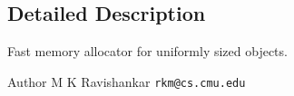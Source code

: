 \subsection{Detailed Description}
Fast memory allocator for uniformly sized objects. 

\begin{DoxyAuthor}{Author}
M K Ravishankar {\tt rkm@cs.\+cmu.\+edu} 
\end{DoxyAuthor}
